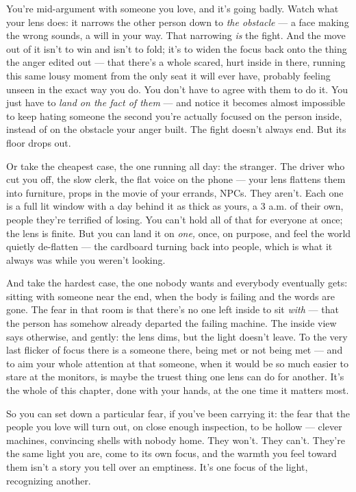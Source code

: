 \documentclass[11pt,openany]{book}
\begin{document}
You’re mid-argument with someone you love, and it’s going badly. Watch what your lens does: it narrows the other person down to \textit{the obstacle} — a face making the wrong sounds, a will in your way. That narrowing \textit{is} the fight. And the move out of it isn’t to win and isn’t to fold; it’s to widen the focus back onto the thing the anger edited out — that there’s a whole scared, hurt inside in there, running this same lousy moment from the only seat it will ever have, probably feeling unseen in the exact way you do. You don’t have to agree with them to do it. You just have to \textit{land on the fact of them} — and notice it becomes almost impossible to keep hating someone the second you’re actually focused on the person inside, instead of on the obstacle your anger built. The fight doesn’t always end. But its floor drops out.

Or take the cheapest case, the one running all day: the stranger. The driver who cut you off, the slow clerk, the flat voice on the phone — your lens flattens them into furniture, props in the movie of your errands, NPCs. They aren’t. Each one is a full lit window with a day behind it as thick as yours, a 3 a.m. of their own, people they’re terrified of losing. You can’t hold all of that for everyone at once; the lens is finite. But you can land it on \textit{one,} once, on purpose, and feel the world quietly de-flatten — the cardboard turning back into people, which is what it always was while you weren’t looking.

And take the hardest case, the one nobody wants and everybody eventually gets: sitting with someone near the end, when the body is failing and the words are gone. The fear in that room is that there’s no one left inside to sit \textit{with} — that the person has somehow already departed the failing machine. The inside view says otherwise, and gently: the lens dims, but the light doesn’t leave. To the very last flicker of focus there is a someone there, being met or not being met — and to aim your whole attention at that someone, when it would be so much easier to stare at the monitors, is maybe the truest thing one lens can do for another. It’s the whole of this chapter, done with your hands, at the one time it matters most.

So you can set down a particular fear, if you’ve been carrying it: the fear that the people you love will turn out, on close enough inspection, to be hollow — clever machines, convincing shells with nobody home. They won’t. They can’t. They’re the same light you are, come to its own focus, and the warmth you feel toward them isn’t a story you tell over an emptiness. It’s one focus of the light, recognizing another.
\end{document}
